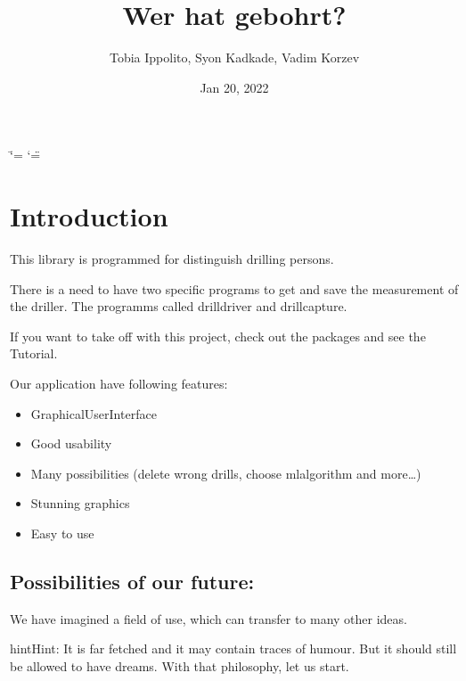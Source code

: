 \documentclass[letterpaper,10pt,english]{sphinxmanual}
\title{Wer hat gebohrt?}
\date{Jan 20, 2022}
\author{Tobia Ippolito, Syon Kadkade, Vadim Korzev}
\begin{document}
\ifdefined\shorthandoff
  \ifnum\catcode`\=\string=\active\shorthandoff{=}\fi
  \ifnum\catcode`\"=\active{}\fi
\fi

\pagestyle{empty}
\sphinxmaketitle
\pagestyle{plain}
\sphinxtableofcontents
\pagestyle{normal}
\label{\detokenize{index::doc}}



\chapter{Introduction}
\label{\detokenize{introduction:introduction}}\label{\detokenize{introduction::doc}}
\sphinxAtStartPar
This library is programmed for distinguish drilling persons.

\sphinxAtStartPar
There is a need to have two specific programs to get and save the measurement of the driller.
The programms called drilldriver and drillcapture.

\sphinxAtStartPar
If you want to take off with this project, check out the packages and see the Tutorial.

\sphinxAtStartPar
Our application have following features:
\begin{itemize}
\item {} 
\sphinxAtStartPar
Graphical\sphinxhyphen{}User\sphinxhyphen{}Interface

\item {} 
\sphinxAtStartPar
Good usability

\item {} 
\sphinxAtStartPar
Many possibilities (delete wrong drills, choose ml\sphinxhyphen{}algorithm and more…)

\item {} 
\sphinxAtStartPar
Stunning graphics

\item {} 
\sphinxAtStartPar
Easy to use

\end{itemize}


\section{Possibilities of our future:}
\label{\detokenize{introduction:possibilities-of-our-future}}
\sphinxAtStartPar
We have imagined a field of use, which can transfer to many other ideas.

\begin{sphinxadmonition}{hint}{Hint:}
\sphinxAtStartPar
It is far fetched and it may contain traces of humour. But it should still be allowed to have dreams.
With that philosophy, let us start.
\end{sphinxadmonition}
\end{document}
